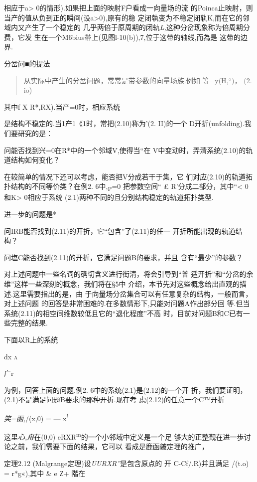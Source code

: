 \documentclass{article}
\begin{document}
相应于a\textgreater{} 0的情形).如果把上面的映射F户看成一向量场的流
的Poinca止映射，则当产的值从负到正的瞬间(设a\textgreater{}0),原有的稳
定闭執变为不稳定闭轨K,而在它的邻域内又产生了一个稳定的
几乎两倍于原周期的闭轨\emph{L,}这种分岔现象称为倍周期分费，它发
生在一个M6bius帯上(见图l-10(b)),7,位于这带的轴线,而為是 这带的边界.

分岔问■的提法

\begin{quote}
从实际中产生的分岔问题，常常是带参数的向量场族.例如 等=y(H,``)， (2. io)
\end{quote}

其中f X R*,RX).当产=0时，相应系统

是结构不稳定的.当1产1《1时，常把(2.10)称为'(2. II)的一个
D开折(unfolding).我们要研究的是：

问能否找到兴=0在R*中的一个邻域V,使得当``在
V中变动时，弄清系统(2.10)的轨道结构如何变化？

在较简单的情况下还可以考虑，能否把V分成若干于集，它
们对应(2.10)的轨道拓扑结构的不同等价类？在例2. 6中,\textsubscript{P}=0
把参数空间`` £ R'分成二部分，其中``\textless{} 0和K\textgreater{}
0相应于系统 (2.1)两种不同的且分别结构稳定的轨道拓扑类型.

进一步的问题是*

问IRB能否找到(2.11)的开折，它``包含''了(2.11)的任一
开折所能出现的轨道结构？

问塩C能否找到(2.11)的开折，它满足问题B的要求，并且 含有``最少''的参数？

对上述问题中一些名词的确切含义进行街清，将会引导到``普
适开折''和``分岔的余维''这样一些深刻的概念，我们将在§5中
介绍，本节先对这些概念给出直观的描述.这里需要指出的是，由
于向量场分岔集合可以有任意复杂的结构，一般而言，对上述问题
的回答是非常困难的.在多数情形下,只能对问题A作出部分回
等.但当系统(2.11)的相空间维数较低且它的``退化程度''不高
时，目前对问题B和C已有一些完整的结果.

下面以R上的系统

dx \textsc{a}

广r

为例，回答上面的问题.例2. 6中的系统(2.1)是(2.12)的一个开
折，我们要证明，(2.1)不是满足问题B要求的那种开折.现在考
虑(2.12)的任意一个C™开折

\emph{笑=函,}/(x,0) = --- x\textsuperscript{!}

这里\emph{心,舟}在(0,0)
eRXR\textsuperscript{m}的一个小邻域中定义是一个足
够大的正整觐在进一歩讨论之前，我们需要下面的结果，它可以
看成是鹿函皴定理的推广，

定理2.12 (Malgrange定理)设\emph{UURXR''}是包含原点的 开 C-Cf/.R)并且满足
/(t.o) = r*g«),其中 \& e Z+ 階在
\end{document}
